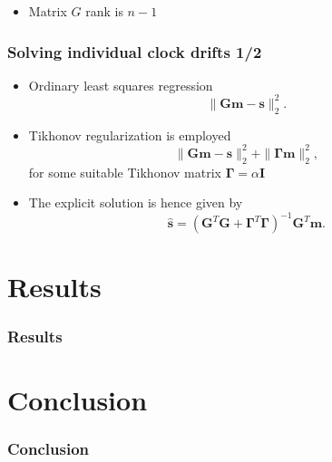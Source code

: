 \documentclass{beamer}
\begin{document}
\begin{frame}
\begin{itemize}
\item Matrix $G$ rank is $n-1$
\end{itemize}
\end{frame}

\begin{frame}
\frametitle{Solving individual clock drifts 1/2}
\begin{itemize}
\item Ordinary least squares regression
\begin{equation}
\| \mathbf{Gm}-\mathbf{s} \|_2^2.
\label{eq:leastsquares}
\end{equation}

\item Tikhonov regularization is employed
\begin{equation}
\| \mathbf{Gm}-\mathbf{s} \|_2^2 + \| \bm{\Gamma}\mathbf{m} \|_2^2, 
\label{eq:tikhonov}
\end{equation}
\quad \quad for some suitable Tikhonov matrix $\bm{\Gamma} = \alpha\mathbf{I}$
\item The explicit solution is hence given by
\begin{equation}
\hat{\mathbf{s}} = (\mathbf{G}^T\mathbf{G} + \bm{\Gamma}^T\bm{\Gamma})^{-1}\mathbf{G}^T\mathbf{m}.  
\end{equation}

\end{itemize}

\end{frame}

\section{Results}
\begin{frame}
\frametitle{Results}
\end{frame}

\section{Conclusion}
 \begin{frame}
\frametitle{Conclusion}
\end{frame}
 
\end{document}
